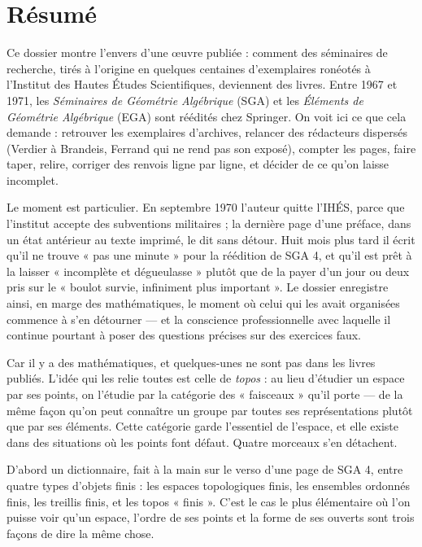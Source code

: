 \documentclass[11pt,a4paper]{article}
\begin{document}
\section*{Résumé}

\begin{resume}
Ce dossier montre l'envers d'une œuvre publiée : comment des séminaires de
recherche, tirés à l'origine en quelques centaines d'exemplaires ronéotés à
l'Institut des Hautes Études Scientifiques, deviennent des livres. Entre 1967
et 1971, les \emph{Séminaires de Géométrie Algébrique} (SGA) et les
\emph{Éléments de Géométrie Algébrique} (EGA) sont réédités chez Springer.
On voit ici ce que cela demande : retrouver les exemplaires d'archives,
relancer des rédacteurs dispersés (Verdier à Brandeis, Ferrand qui ne rend pas
son exposé), compter les pages, faire taper, relire, corriger des renvois
ligne par ligne, et décider de ce qu'on laisse incomplet.

Le moment est particulier. En septembre 1970 l'auteur quitte l'IHÉS, parce
que l'institut accepte des subventions militaires ; la dernière page d'une
préface, dans un état antérieur au texte imprimé, le dit sans détour. Huit mois
plus tard il écrit qu'il ne trouve « pas une minute » pour la réédition de
SGA 4, et qu'il est prêt à la laisser « incomplète et dégueulasse » plutôt que
de la payer d'un jour ou deux pris sur le « boulot survie, infiniment plus
important ». Le dossier enregistre ainsi, en marge des mathématiques, le
moment où celui qui les avait organisées commence à s'en détourner --- et la
conscience professionnelle avec laquelle il continue pourtant à poser des
questions précises sur des exercices faux.

Car il y a des mathématiques, et quelques-unes ne sont pas dans les livres
publiés. L'idée qui les relie toutes est celle de \emph{topos} : au lieu
d'étudier un espace par ses points, on l'étudie par la catégorie des
« faisceaux » qu'il porte --- de la même façon qu'on peut connaître un groupe
par toutes ses représentations plutôt que par ses éléments. Cette catégorie
garde l'essentiel de l'espace, et elle existe dans des situations où les
points font défaut. Quatre morceaux s'en détachent.

D'abord un dictionnaire, fait à la main sur le verso d'une page de SGA 4,
entre quatre types d'objets finis : les espaces topologiques finis, les
ensembles ordonnés finis, les treillis finis, et les topos « finis ». C'est
le cas le plus élémentaire où l'on puisse voir qu'un espace, l'ordre de ses
points et la forme de ses ouverts sont trois façons de dire la même chose.


\end{resume}
\end{document}
